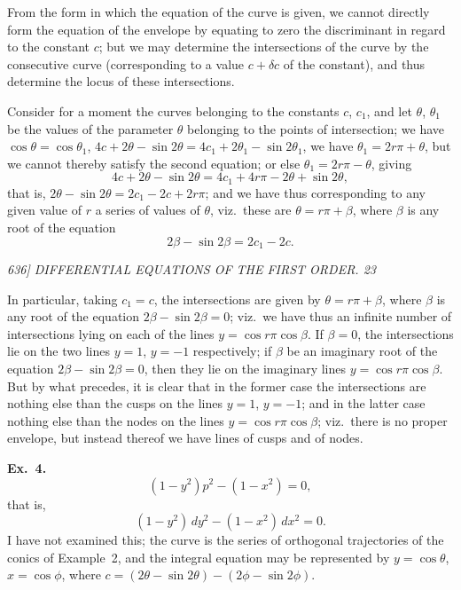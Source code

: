 \documentclass[12pt,a4paper]{article}
\begin{document}
From the form in which the equation of the curve is given, we cannot directly form the equation of the envelope by equating to zero the discriminant in regard to the constant $c$; but we may determine the intersections of the curve by the consecutive curve (corresponding to a value $c + \delta c$ of the constant), and thus determine the locus of these intersections.

Consider for a moment the curves belonging to the constants $c$, $c_1$, and let $\theta$, $\theta_1$ be the values of the parameter $\theta$ belonging to the points of intersection; we have $\cos\theta = \cos\theta_1$, $4 c + 2\theta - \sin 2\theta = 4 c_1 + 2\theta_1 - \sin 2\theta_1$, we have $\theta_1 = 2 r \pi + \theta$, but we cannot thereby satisfy the second equation; or else $\theta_1 = 2 r \pi - \theta$, giving
\[
4 c + 2\theta - \sin 2\theta = 4 c_1 + 4 r \pi - 2\theta + \sin 2\theta,
\]
that is, $2\theta - \sin 2\theta = 2 c_1 - 2 c + 2 r \pi$; and we have thus corresponding to any given value of $r$ a series of values of $\theta$, viz.\ these are $\theta = r \pi + \beta$, where $\beta$ is any root of the equation
\[
2\beta - \sin 2\beta = 2 c_1 - 2 c.
\]

\clearpage
\setcounter{page}{23}

\begin{center}
\textit{636] \hfill DIFFERENTIAL EQUATIONS OF THE FIRST ORDER. \hfill 23}
\end{center}

In particular, taking $c_1 = c$, the intersections are given by $\theta = r \pi + \beta$, where $\beta$ is any root of the equation $2\beta - \sin 2\beta = 0$; viz.\ we have thus an infinite number of intersections lying on each of the lines $y = \cos r \pi \cos \beta$. If $\beta = 0$, the intersections lie on the two lines $y = 1$, $y = -1$ respectively; if $\beta$ be an imaginary root of the equation $2\beta - \sin 2\beta = 0$, then they lie on the imaginary lines $y = \cos r \pi \cos \beta$. But by what precedes, it is clear that in the former case the intersections are nothing else than the cusps on the lines $y = 1$, $y = -1$; and in the latter case nothing else than the nodes on the lines $y = \cos r \pi \cos \beta$; viz.\ there is no proper envelope, but instead thereof we have lines of cusps and of nodes.

\medskip\noindent\textbf{Ex.~4.}
\[
(1 - y^2) p^2 - (1 - x^2) = 0,
\]
that is,
\[
(1 - y^2)\, d y^2 - (1 - x^2)\, d x^2 = 0.
\]
I have not examined this; the curve is the series of orthogonal trajectories of the conics of Example~2, and the integral equation may be represented by $y = \cos\theta$, $x = \cos\phi$, where $c = (2\theta - \sin 2\theta) - (2\phi - \sin 2\phi)$.
\end{document}
